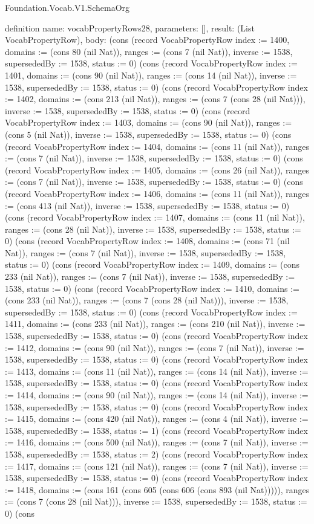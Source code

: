 \begin{lexlean}{Foundation.Vocab.V1.SchemaOrg}
\begin{semanticmodule}
definition{
  name: vocabPropertyRows28,
  parameters: [],
  result: (List VocabPropertyRow),
  body: (cons (record VocabPropertyRow {index := 1400, domains := (cons 80 (nil Nat)), ranges := (cons 7 (nil Nat)), inverse := 1538, supersededBy := 1538, status := 0}) (cons (record VocabPropertyRow {index := 1401, domains := (cons 90 (nil Nat)), ranges := (cons 14 (nil Nat)), inverse := 1538, supersededBy := 1538, status := 0}) (cons (record VocabPropertyRow {index := 1402, domains := (cons 213 (nil Nat)), ranges := (cons 7 (cons 28 (nil Nat))), inverse := 1538, supersededBy := 1538, status := 0}) (cons (record VocabPropertyRow {index := 1403, domains := (cons 90 (nil Nat)), ranges := (cons 5 (nil Nat)), inverse := 1538, supersededBy := 1538, status := 0}) (cons (record VocabPropertyRow {index := 1404, domains := (cons 11 (nil Nat)), ranges := (cons 7 (nil Nat)), inverse := 1538, supersededBy := 1538, status := 0}) (cons (record VocabPropertyRow {index := 1405, domains := (cons 26 (nil Nat)), ranges := (cons 7 (nil Nat)), inverse := 1538, supersededBy := 1538, status := 0}) (cons (record VocabPropertyRow {index := 1406, domains := (cons 11 (nil Nat)), ranges := (cons 413 (nil Nat)), inverse := 1538, supersededBy := 1538, status := 0}) (cons (record VocabPropertyRow {index := 1407, domains := (cons 11 (nil Nat)), ranges := (cons 28 (nil Nat)), inverse := 1538, supersededBy := 1538, status := 0}) (cons (record VocabPropertyRow {index := 1408, domains := (cons 71 (nil Nat)), ranges := (cons 7 (nil Nat)), inverse := 1538, supersededBy := 1538, status := 0}) (cons (record VocabPropertyRow {index := 1409, domains := (cons 233 (nil Nat)), ranges := (cons 7 (nil Nat)), inverse := 1538, supersededBy := 1538, status := 0}) (cons (record VocabPropertyRow {index := 1410, domains := (cons 233 (nil Nat)), ranges := (cons 7 (cons 28 (nil Nat))), inverse := 1538, supersededBy := 1538, status := 0}) (cons (record VocabPropertyRow {index := 1411, domains := (cons 233 (nil Nat)), ranges := (cons 210 (nil Nat)), inverse := 1538, supersededBy := 1538, status := 0}) (cons (record VocabPropertyRow {index := 1412, domains := (cons 90 (nil Nat)), ranges := (cons 7 (nil Nat)), inverse := 1538, supersededBy := 1538, status := 0}) (cons (record VocabPropertyRow {index := 1413, domains := (cons 11 (nil Nat)), ranges := (cons 14 (nil Nat)), inverse := 1538, supersededBy := 1538, status := 0}) (cons (record VocabPropertyRow {index := 1414, domains := (cons 90 (nil Nat)), ranges := (cons 14 (nil Nat)), inverse := 1538, supersededBy := 1538, status := 0}) (cons (record VocabPropertyRow {index := 1415, domains := (cons 420 (nil Nat)), ranges := (cons 4 (nil Nat)), inverse := 1538, supersededBy := 1538, status := 1}) (cons (record VocabPropertyRow {index := 1416, domains := (cons 500 (nil Nat)), ranges := (cons 7 (nil Nat)), inverse := 1538, supersededBy := 1538, status := 2}) (cons (record VocabPropertyRow {index := 1417, domains := (cons 121 (nil Nat)), ranges := (cons 7 (nil Nat)), inverse := 1538, supersededBy := 1538, status := 0}) (cons (record VocabPropertyRow {index := 1418, domains := (cons 161 (cons 605 (cons 606 (cons 893 (nil Nat))))), ranges := (cons 7 (cons 28 (nil Nat))), inverse := 1538, supersededBy := 1538, status := 0}) (cons }
\end{semanticmodule}
\end{lexlean}
